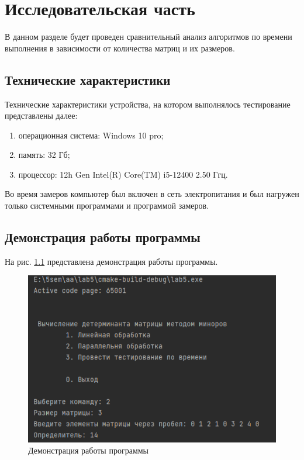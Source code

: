 \chapter{Исследовательская часть}
\hspace{\parindent}В данном разделе будет проведен сравнительный анализ алгоритмов по времени выполнения в зависимости от количества матриц и их размеров.

\section{Технические характеристики}
\hspace{\parindent}Технические характеристики устройства, на котором выполнялось тестирование представлены далее:

\begin{enumerate}
    \item операционная система: Windows 10 pro;
    \item память: 32 Гб;
    \item процессор: 12h Gen Intel(R) Core(TM) i5-12400 2.50 Ггц.
\end{enumerate}
\hspace{\parindent}Во время замеров компьютер был включен в сеть электропитания и был нагружен только системными программами и программой замеров.
\clearpage

\section{Демонстрация работы программы}
\hspace{\parindent}На рис. \ref{fig:demonstration} представлена демонстрация работы программы. 

\begin{figure}[h]
	\centering
	\includegraphics[height=0.4\textheight]{img/ex.png}
	\caption{Демонстрация работы программы}
	\label{fig:demonstration}
\end{figure}

